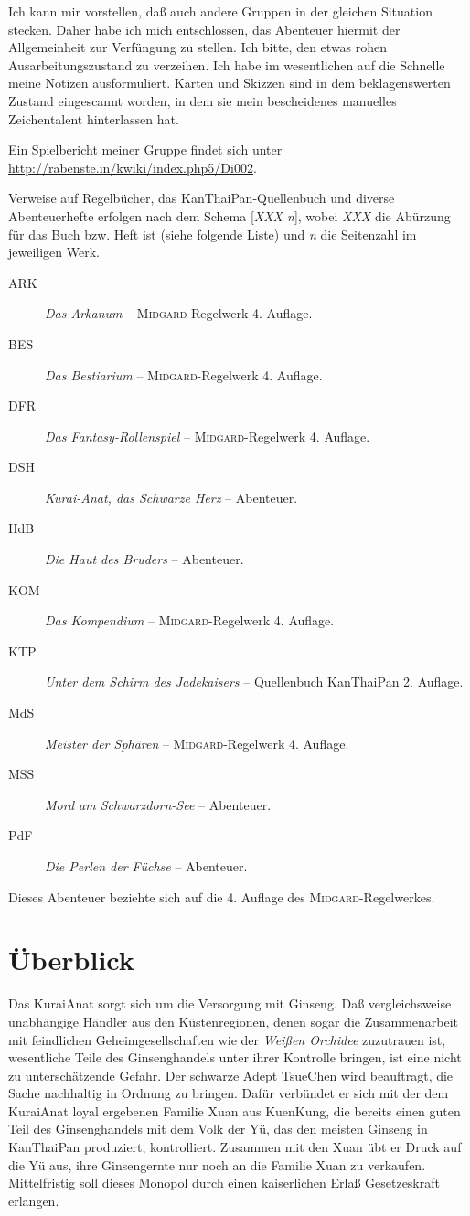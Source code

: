 \documentclass[
a4paper,
twoside,
DIV=calc,
BCOR=4mm,
fontsize=9pt,
twocolumn=on,
titlepage=on,
parskip=half
]{scrartcl}
\newcommand{\midgard}{\textsc{Midgard}}
\begin{document}
Ich kann mir vorstellen, daß auch andere Gruppen in der gleichen
Situation stecken. Daher habe ich mich entschlossen, das Abenteuer
hiermit der Allgemeinheit zur Verfüngung zu stellen. Ich bitte, den
etwas rohen Ausarbeitungszustand zu verzeihen. Ich habe im
wesentlichen auf die Schnelle meine Notizen ausformuliert. Karten und
Skizzen sind in dem beklagenswerten Zustand eingescannt worden, in dem
sie mein bescheidenes manuelles Zeichentalent hinterlassen hat.

Ein Spielbericht meiner Gruppe findet sich unter
\url{http://rabenste.in/kwiki/index.php5/Di002}.

Verweise auf Regelbücher, das KanThaiPan-Quellenbuch und diverse
Abenteuerhefte erfolgen nach dem Schema [\emph{XXX n}], wobei
\emph{XXX} die Abürzung für das Buch bzw. Heft ist (siehe folgende
Liste) und \emph{n} die Seitenzahl im jeweiligen Werk.

\begin{description}
\item[ARK] \emph{Das Arkanum} -- \midgard-Regelwerk 4. Auflage.
\item[BES] \emph{Das Bestiarium} -- \midgard-Regelwerk 4. Auflage.
\item[DFR] \emph{Das Fantasy-Rollenspiel} -- \midgard-Regelwerk 4. Auflage.
\item[DSH] \emph{Kurai-Anat, das Schwarze Herz} -- Abenteuer.
\item[HdB] \emph{Die Haut des Bruders} -- Abenteuer.
\item[KOM] \emph{Das Kompendium} -- \midgard-Regelwerk 4. Auflage.
\item[KTP] \emph{Unter dem Schirm des Jadekaisers} -- Quellenbuch
  KanThaiPan 2. Auflage.
\item[MdS] \emph{Meister der Sphären} -- \midgard-Regelwerk 4. Auflage.
\item[MSS] \emph{Mord am Schwarzdorn-See} -- Abenteuer.
\item[PdF] \emph{Die Perlen der Füchse} -- Abenteuer.
\end{description}

Dieses Abenteuer beziehte sich auf die 4. Auflage des \midgard-Regelwerkes.

\section{Überblick}

Das KuraiAnat sorgt sich um die Versorgung mit Ginseng. Daß
vergleichsweise unabhängige Händler aus den Küstenregionen, denen
sogar die Zusammenarbeit mit feindlichen Geheimgesellschaften wie der
\emph{Weißen Orchidee} zuzutrauen ist, wesentliche Teile des
Ginsenghandels unter ihrer Kontrolle bringen, ist eine nicht zu
unterschätzende Gefahr. Der schwarze Adept TsueChen wird beauftragt,
die Sache nachhaltig in Ordnung zu bringen. Dafür verbündet er sich
mit der dem KuraiAnat loyal ergebenen Familie Xuan aus KuenKung, die
bereits einen guten Teil des Ginsenghandels mit dem Volk der Yü, das
den meisten Ginseng in KanThaiPan produziert, kontrolliert. Zusammen
mit den Xuan übt er Druck auf die Yü aus, ihre Ginsengernte nur noch
an die Familie Xuan zu verkaufen. Mittelfristig soll dieses Monopol
durch einen kaiserlichen Erlaß Gesetzeskraft erlangen.
\end{document}
